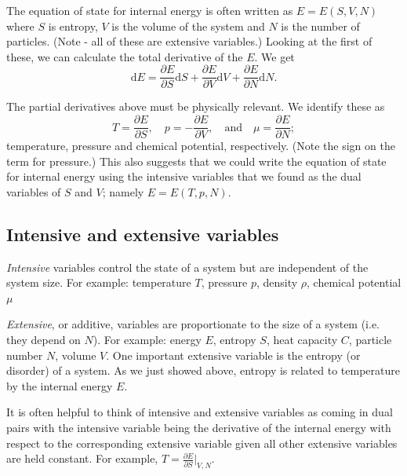 The equation of state for internal energy is often written as $E = E(S,V,N)$ where $S$ is entropy, $V$ is the volume of the system and $N$ is the number of particles. (Note - all of these are extensive variables.)
Looking at the first of these, we can calculate the total derivative of the $E$. We get
$$
	\mathrm{d}E = \frac{\partial E}{\partial S}\mathrm{d}S +  \frac{\partial E}{\partial V}\mathrm{d}V +  \frac{\partial E}{\partial N}\mathrm{d}N.  
$$

The partial derivatives above must be physically relevant. We identify these as 
$$
T =  \frac{\partial E}{\partial S}, \quad p = -\frac{\partial E}{\partial V},\quad \mbox{and}  \quad \mu = \frac{\partial E}{\partial N};
$$ 
temperature, pressure and chemical potential, respectively. (Note the sign on the term for pressure.) This also suggests that we could write the equation of state for internal energy using the intensive variables that we found as the dual variables of $S$ and $V$; namely $E = E(T,p,N)$.

\subsection{Intensive and extensive variables}

\emph{Intensive} variables control the state of a system but are independent of the system size. For example: temperature $T$, pressure $p$, density $\rho$, chemical potential $\mu$

\emph{Extensive}, or additive, variables are proportionate to the size of a system (i.e. they depend on $N$). For example: energy $E$, entropy $S$, heat capacity $C$, particle number $N$, volume $V$.
One important extensive variable is the entropy (or disorder) of a system. As we just showed above, entropy is related to temperature by the internal energy $E$.

It is often helpful to think of intensive and extensive variables as coming in dual pairs with the intensive variable being the derivative of the internal energy with respect to the corresponding extensive variable given all other extensive variables are held constant. For example, $T = \frac{\partial E}{\partial S}\vert_{V,N}$.

